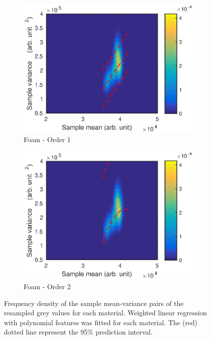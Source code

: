 \documentclass[12pt]{report}
\begin{document}
\begin{figure}
\begin{subfigure}{0.45\textwidth}
		\includegraphics[width=\textwidth]{figures/meanVar/subsample_foam1.eps}
		\caption{Foam - Order 1}
	\end{subfigure}
	\begin{subfigure}{0.45\textwidth}
		\includegraphics[width=\textwidth]{figures/meanVar/subsample_foam2.eps}
		\caption{Foam - Order 2}
	\end{subfigure}
	\caption{Frequency density of the sample mean-variance pairs of the resampled grey values for each material. Weighted linear regression with polynomial features was fitted for each material. The (red) dotted line represent the 95\% prediction interval.}
	\label{fig:subsample_meanVar}
\end{figure}
\end{document}
